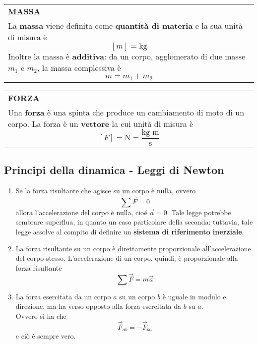 \documentclass[a4paper]{extarticle}
\renewcommand\arraystretch{}
\begin{document}
\vspace{1em}
\setlength{\tabcolsep}{14pt}
\renewcommand{\arraystretch}{2}
\noindent
\begin{tabularx}{\textwidth}{@{}|P|@{}}
    \hline
    {\textbf{MASSA}}\\
    \parbox{\linewidth}{La \textbf{massa} viene definita come \textbf{quantità di materia} e la sua unità di misura è
    \[[m] = \text{kg}\]
    Inoltre la massa è \textbf{additiva}: da un corpo, agglomerato di due masse $m_1$ e $m_2$, la massa complessiva è
    \[m = m_1 + m_2\]
     \vspace{-1mm}}\\
    \hline
\end{tabularx}
\vspace{1em}

\vspace{1em}
\setlength{\tabcolsep}{14pt}
\renewcommand{\arraystretch}{2}
\noindent
\begin{tabularx}{\textwidth}{@{}|P|@{}}
    \hline
    {\textbf{FORZA}}\\
    \parbox{\linewidth}{Una \textbf{forza} è una spinta che produce un cambiamento di moto di un corpo.\\
    La forza è un \textbf{vettore} la cui unità di misura è
    \[[F] = \text{N} = \frac{\text{kg m}}{\text{s}}\]
    \vspace{-1mm}}\\
    \hline
\end{tabularx}

\vspace{1em}
\subsection{Principi della dinamica - Leggi di Newton}
\begin{enumerate}
  \item Se la forza risultante che agisce su un corpo è nulla, ovvero
  \[\sum \vec{F} = 0\]
  allora l'accelerazione del corpo è nulla, cioé $\vec{a}=0$. Tale legge potrebbe sembrare superflua, in quanto un caso particolare della seconda: tuttavia, tale legge assolve al compito di definire un \textbf{sistema di riferimento inerziale}.

  \item La forza risultante su un corpo è direttamente proporzionale all'accelerazione del corpo stesso. L'accelerazione di un corpo, quindi, è proporzionale alla forza risultante
  \[\sum \vec{F} = m \vec{a}\]

  \item La forza esercitata da un corpo $a$ su un corpo $b$ è uguale in modulo e direzione, ma ha verso opposto alla forza esercitata da $b$ su $a$.\\
  Ovvero si ha che
  \[\vec{F}_{ab} = -\vec{F}_{ba}\]
  e ciò è sempre vero.
\end{enumerate}
\end{document}
